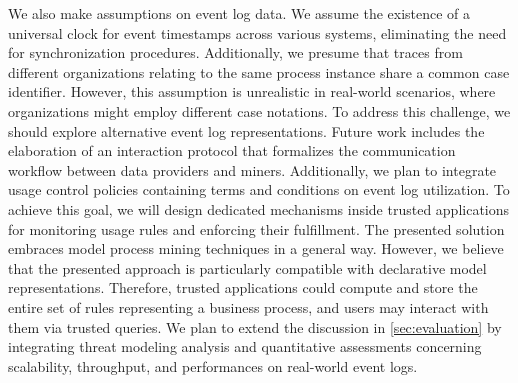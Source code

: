 We also make assumptions on event log data. We assume the existence of a universal clock for event timestamps across various systems, eliminating the need for synchronization procedures. Additionally, we presume that traces from different organizations relating to the same process instance share a common case identifier. However, this assumption is unrealistic in real-world scenarios, where organizations might employ different case notations. To address this challenge, we should explore alternative event log representations. Future work includes the elaboration of an interaction protocol that formalizes the communication workflow between data providers and miners. Additionally, we plan to integrate usage control policies containing terms and conditions on event log utilization. To achieve this goal, we will design dedicated mechanisms inside trusted applications for monitoring usage rules and enforcing their fulfillment. The presented solution embraces model process mining techniques in a general way. However, we believe that the presented approach is particularly compatible with declarative model representations. Therefore, trusted applications could compute and store the entire set of rules representing a business process, and users may interact with them via trusted queries. We plan to extend the discussion in \cref{sec:evaluation} by integrating threat modeling analysis and quantitative assessments concerning scalability, throughput, and performances on real-world event logs.

